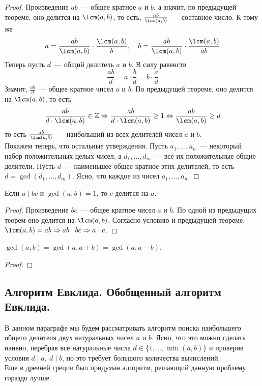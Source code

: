 \documentclass[11pt]{article}
\begin{document}
\begin{proof}
	Произведение $ab$~--- общее кратное $a$ и $b$, а значит, по предыдущей теореме, оно делится на $\lcm(a, b)$, то есть,
	$\frac{ab}{\lcm(a, b)}$~--- составное число. К тому же
	\[ a = \frac{a b}{\lcm(a,b)} \cdot \frac{\lcm(a, b)}{b}, \quad b = \frac{ab}{\lcm(a, b)} \cdot \frac{\lcm(a, b)}{ab}\]
	Теперь пусть $d$~--- общий делитель $a$ и $b$. В силу равенств
	\[ \frac{ab}{d} = a \cdot \frac{b}{d} = b \cdot \frac{a}{d} \]
	Значит, $\frac{ab}{d}$~--- общее кратное чисел $a$ и $b$. По предыдущей теореме, оно делится на $\lcm(a, b)$, то есть
	\[ \frac{ab}{d \cdot \lcm(a, b)} \in \mathbb{Z} \Rightarrow \frac{ab}{d \cdot \lcm(a, b)} \ge 1 \Leftrightarrow \frac{ab}{\lcm(a, b)} \ge d \]
	то есть $\frac{ab}{\lcm(a, b)}$~--- наибольший из всех делителей чисел $a$ и $b$.\\

	Покажем теперь, что остальные утверждения. Пусть $a_1, \ldots, a_n$~--- некоторый набор положительных целых чисел, а
	$d_1, \ldots, d_m$~--- все их положительные общие делители. Пусть $d$~--- наименьшее общее кратное
	этих делителей, то есть $d = \gcd(d_1, \ldots, d_m)$. Ясно, что каждое из чисел $a_1, \ldots, a_n$.


\end{proof}
\begin{corollary}
    Если $a \mid bc$ и $\gcd(a, b) = 1$, то $c$ делится на $a$.
 \end{corollary}
\begin{proof}
	Произведение $bc$~--- общее кратное чисел $a$ и $b$. По одной из предыдущих теорем оно делится на $\lcm(a, b)$.
	Согласно условию и предыдущей теореме, $\lcm(a, b) = ab \Rightarrow ab \mid bc \Rightarrow a \mid c$.
\end{proof}
\begin{statement}

	$\gcd(a, b) = \gcd(a, a + b) = \gcd(a, a - b)$.

\end{statement}
\begin{proof}

\end{proof}
\subsection{Алгоритм Евклида. Обобщенный алгоритм Евклида.}

	В данном параграфе мы будем рассматривать алгоритм поиска наибольшего общего делителя двух натуральных чисел $a$ и $b$.
	Ясно, что это можно сделать наивно, перебрав все натуральные числа $d \in \{ 1, \ldots, \min(a, b) \}$ и проверив условия $d \mid a, \ d \mid b$, но
	это требует большого количества вычислений.\\
	Еще в древней греции был придуман алгоритм, решающий данную проблему гораздо лучше.
\end{document}
